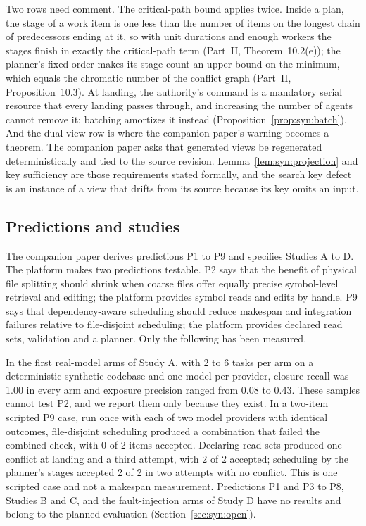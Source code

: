 \documentclass[11pt,letterpaper]{article}
\theoremstyle{definition}
\theoremstyle{remark}
\begin{document}
Two rows need comment. The critical-path bound applies twice. Inside a plan, the stage of a work item is one less than the number of items on the longest chain of predecessors ending at it, so with unit durations and enough workers the stages finish in exactly the critical-path term (Part~II, Theorem~10.2(e)); the planner's fixed order makes its stage count an upper bound on the minimum, which equals the chromatic number of the conflict graph \cite{roy1967} (Part~II, Proposition~10.3). At landing, the authority's command is a mandatory serial resource that every landing passes through, and increasing the number of agents cannot remove it; batching amortizes it instead (Proposition~\ref{prop:syn:batch}). And the dual-view row is where the companion paper's warning becomes a theorem. The companion paper asks that generated views be regenerated deterministically and tied to the source revision. Lemma~\ref{lem:syn:projection} and key sufficiency are those requirements stated formally, and the search key defect is an instance of a view that drifts from its source because its key omits an input.

\subsection{Predictions and studies}

The companion paper derives predictions P1 to P9 and specifies Studies A to D. The platform makes two predictions testable. P2 says that the benefit of physical file splitting should shrink when coarse files offer equally precise symbol-level retrieval and editing; the platform provides symbol reads and edits by handle. P9 says that dependency-aware scheduling should reduce makespan and integration failures relative to file-disjoint scheduling; the platform provides declared read sets, validation and a planner. Only the following has been measured.

In the first real-model arms of Study A, with 2 to 6 tasks per arm on a deterministic synthetic codebase and one model per provider, closure recall was 1.00 in every arm and exposure precision ranged from 0.08 to 0.43. %
These samples cannot test P2, and we report them only because they exist. In a two-item scripted P9 case, run once with each of two model providers with identical outcomes, file-disjoint scheduling produced a combination that failed the combined check, with 0 of 2 items accepted. Declaring read sets produced one conflict at landing and a third attempt, with 2 of 2 accepted; scheduling by the planner's stages accepted 2 of 2 in two attempts with no conflict. %
This is one scripted case and not a makespan measurement. Predictions P1 and P3 to P8, Studies B and C, and the fault-injection arms of Study D have no results and belong to the planned evaluation (Section~\ref{sec:syn:open}).
\end{document}
